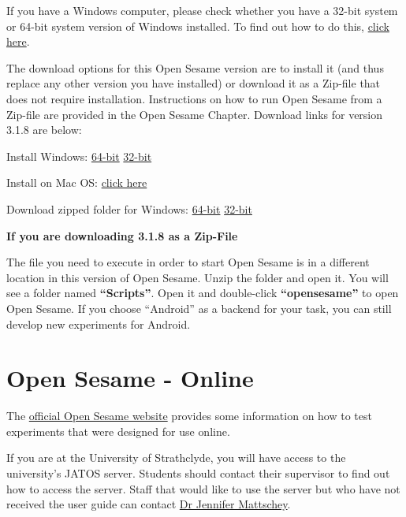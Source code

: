 \documentclass[
]{book}
\begin{document}
If you have a Windows computer, please check whether you have a 32-bit system or 64-bit system version of Windows installed. To find out how to do this, \href{https://www.howtogeek.com/howto/21726/how-do-i-know-if-im-running-32-bit-or-64-bit-windows-answers/}{click here}.

The download options for this Open Sesame version are to install it (and thus replace any other version you have installed) or download it as a Zip-file that does not require installation. Instructions on how to run Open Sesame from a Zip-file are provided in the Open Sesame Chapter. Download links for version 3.1.8 are below:

Install Windows:
\href{https://github.com/smathot/OpenSesame/releases/download/release\%2F3.1.8/opensesame_3.1.8-py3.5-win64-1.exe}{64-bit}
\href{https://github.com/smathot/OpenSesame/releases/download/release\%2F3.1.8/opensesame_3.1.8-py2.7-win32-1.exe}{32-bit}

Install on Mac OS: \href{https://github.com/smathot/OpenSesame/releases/download/release\%2F3.1.8/opensesame_3.1.8-py2.7-macos-1.dmg}{click here}

Download zipped folder for Windows:
\href{https://github.com/smathot/OpenSesame/releases/download/release\%2F3.1.8/opensesame_3.1.8-py3.5-win64-1.zip}{64-bit}
\href{https://github.com/smathot/OpenSesame/releases/download/release\%2F3.1.8/opensesame_3.1.8-py2.7-win32-1.zip}{32-bit}

\textbf{If you are downloading 3.1.8 as a Zip-File}

The file you need to execute in order to start Open Sesame is in a different location in this version of Open Sesame. Unzip the folder and open it. You will see a folder named \textbf{``Scripts''}. Open it and double-click \textbf{``opensesame''} to open Open Sesame. If you choose ``Android'' as a backend for your task, you can still develop new experiments for Android.

\hypertarget{open-sesame---online}{%
\chapter{Open Sesame - Online}\label{open-sesame---online}}

The \href{https://osdoc.cogsci.nl/3.2/manual/osweb/}{official Open Sesame website} provides some information on how to test experiments that were designed for use online.

If you are at the University of Strathclyde, you will have access to the university's JATOS server. Students should contact their supervisor to find out how to access the server. Staff that would like to use the server but who have not received the user guide can contact \href{jennifer.mattschey@strath.ac.uk}{Dr Jennifer Mattschey}.
\end{document}
